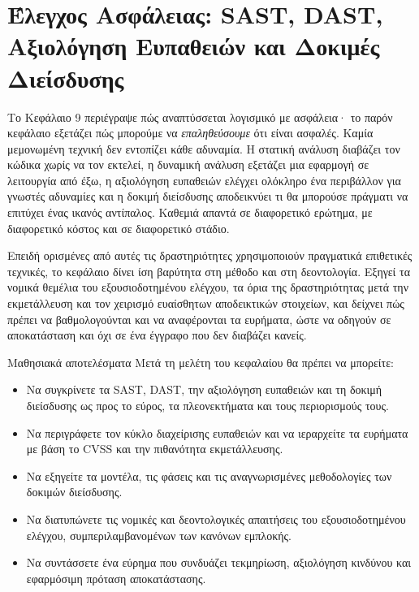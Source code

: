 \chapter{Έλεγχος Ασφάλειας: SAST, DAST, Αξιολόγηση Ευπαθειών και Δοκιμές Διείσδυσης}\label{ch:10}

Το Κεφάλαιο 9 περιέγραψε πώς αναπτύσσεται λογισμικό με ασφάλεια· το παρόν κεφάλαιο εξετάζει πώς μπορούμε να \emph{επαληθεύσουμε} ότι είναι ασφαλές. Καμία μεμονωμένη τεχνική δεν εντοπίζει κάθε αδυναμία. Η στατική ανάλυση διαβάζει τον κώδικα χωρίς να τον εκτελεί, η δυναμική ανάλυση εξετάζει μια εφαρμογή σε λειτουργία από έξω, η αξιολόγηση ευπαθειών ελέγχει ολόκληρο ένα περιβάλλον για γνωστές αδυναμίες και η δοκιμή διείσδυσης αποδεικνύει τι θα μπορούσε πράγματι να επιτύχει ένας ικανός αντίπαλος. Καθεμιά απαντά σε διαφορετικό ερώτημα, με διαφορετικό κόστος και σε διαφορετικό στάδιο.

Επειδή ορισμένες από αυτές τις δραστηριότητες χρησιμοποιούν πραγματικά επιθετικές τεχνικές, το κεφάλαιο δίνει ίση βαρύτητα στη μέθοδο και στη δεοντολογία. Εξηγεί τα νομικά θεμέλια του εξουσιοδοτημένου ελέγχου, τα όρια της δραστηριότητας μετά την εκμετάλλευση και τον χειρισμό ευαίσθητων αποδεικτικών στοιχείων, και δείχνει πώς πρέπει να βαθμολογούνται και να αναφέρονται τα ευρήματα, ώστε να οδηγούν σε αποκατάσταση και όχι σε ένα έγγραφο που δεν διαβάζει κανείς.

\begin{outcomesbox}{Μαθησιακά αποτελέσματα}
Μετά τη μελέτη του κεφαλαίου θα πρέπει να μπορείτε:
\begin{itemize}
  \item Να συγκρίνετε τα SAST, DAST, την αξιολόγηση ευπαθειών και τη δοκιμή διείσδυσης ως προς το εύρος, τα πλεονεκτήματα και τους περιορισμούς τους.
  \item Να περιγράφετε τον κύκλο διαχείρισης ευπαθειών και να ιεραρχείτε τα ευρήματα με βάση το CVSS και την πιθανότητα εκμετάλλευσης.
  \item Να εξηγείτε τα μοντέλα, τις φάσεις και τις αναγνωρισμένες μεθοδολογίες των δοκιμών διείσδυσης.
  \item Να διατυπώνετε τις νομικές και δεοντολογικές απαιτήσεις του εξουσιοδοτημένου ελέγχου, συμπεριλαμβανομένων των κανόνων εμπλοκής.
  \item Να συντάσσετε ένα εύρημα που συνδυάζει τεκμηρίωση, αξιολόγηση κινδύνου και εφαρμόσιμη πρόταση αποκατάστασης.
\end{itemize}
\end{outcomesbox}

